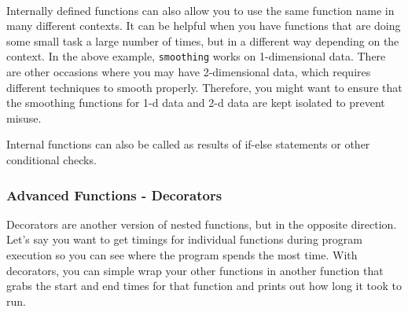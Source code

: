     \begin{center}
    \end{center}
    { \hspace*{\fill} \\}
    
    Internally defined functions can also allow you to use the same function
name in many different contexts. It can be helpful when you have
functions that are doing some small task a large number of times, but in
a different way depending on the context. In the above example,
\texttt{smoothing} works on 1-dimensional data. There are other
occasions where you may have 2-dimensional data, which requires
different techniques to smooth properly. Therefore, you might want to
ensure that the smoothing functions for 1-d data and 2-d data are kept
isolated to prevent misuse.

Internal functions can also be called as results of if-else statements
or other conditional checks.

    \hypertarget{advanced-functions---decorators}{%
\subsubsection{Advanced Functions -
Decorators}\label{advanced-functions---decorators}}

Decorators are another version of nested functions, but in the opposite
direction. Let's say you want to get timings for individual functions during program execution so you can see where the program spends the most time.  With decorators, you can simple wrap your other functions in another function that grabs the start and end times for that function and prints out how long it took to run.

